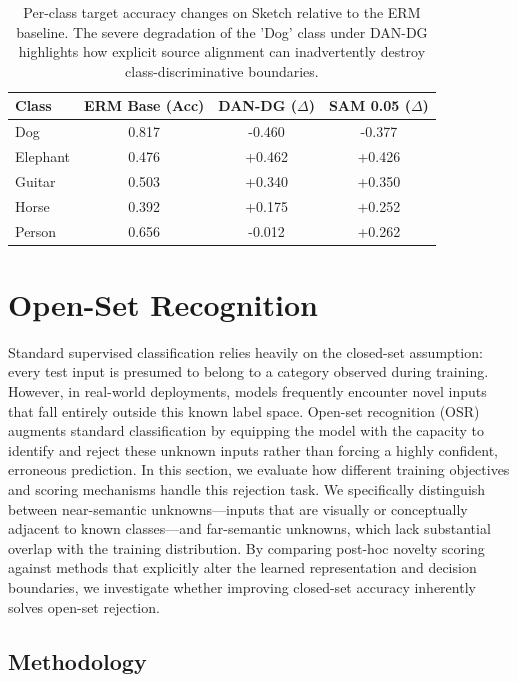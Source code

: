 \documentclass{article}
\begin{document}
\begin{table}[ht]
  \caption{Per-class target accuracy changes on Sketch relative to the ERM baseline. The severe degradation of the 'Dog' class under DAN-DG highlights how explicit source alignment can inadvertently destroy class-discriminative boundaries.}
  \label{tab:task3_per_class}
  \centering
  \begin{tabular}{lccc}
    \toprule
    Class & ERM Base (Acc) & DAN-DG ($\Delta$) & SAM 0.05 ($\Delta$) \\
    \midrule
    Dog & 0.817 & -0.460 & -0.377 \\
    Elephant & 0.476 & +0.462 & +0.426 \\
    Guitar & 0.503 & +0.340 & +0.350 \\
    Horse & 0.392 & +0.175 & +0.252 \\
    Person & 0.656 & -0.012 & +0.262 \\
    \bottomrule
  \end{tabular}
\end{table}

\section{Open-Set Recognition}
\label{section:osr}

Standard supervised classification relies heavily on the closed-set assumption: every test input is presumed to belong to a category observed during training. However, in real-world deployments, models frequently encounter novel inputs that fall entirely outside this known label space. Open-set recognition (OSR) augments standard classification by equipping the model with the capacity to identify and reject these unknown inputs rather than forcing a highly confident, erroneous prediction. In this section, we evaluate how different training objectives and scoring mechanisms handle this rejection task. We specifically distinguish between near-semantic unknowns—inputs that are visually or conceptually adjacent to known classes—and far-semantic unknowns, which lack substantial overlap with the training distribution. By comparing post-hoc novelty scoring against methods that explicitly alter the learned representation and decision boundaries, we investigate whether improving closed-set accuracy inherently solves open-set rejection.

\subsection{Methodology}
\end{document}
